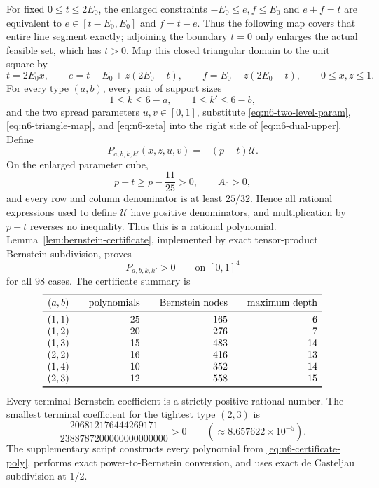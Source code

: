 \documentclass[11pt,a4paper]{article}
\numberwithin{equation}{section}
\theoremstyle{definition}
\newcommand{\1}{\mathbf{1}}
\begin{document}
For fixed $0\le t\le2E_0$, the enlarged constraints
$-E_0\le e,f\le E_0$ and $e+f=t$ are equivalent to
$e\in[t-E_0,E_0]$ and $f=t-e$.  Thus the following map covers that entire
line segment exactly; adjoining the boundary $t=0$ only enlarges the actual
feasible set, which has $t>0$.  Map this closed triangular domain to the
unit square by
\begin{equation}\label{eq:n6-triangle-map}
 t=2E_0x,
 \qquad
 e=t-E_0+z(2E_0-t),
 \qquad
 f=E_0-z(2E_0-t),
 \qquad 0\le x,z\le1.
\end{equation}
For every type $(a,b)$, every pair of support sizes
\[
 1\le k\le6-a,
 \qquad
 1\le k'\le6-b,
\]
and the two spread parameters $u,v\in[0,1]$, substitute
\eqref{eq:n6-two-level-param}, \eqref{eq:n6-triangle-map}, and
\eqref{eq:n6-zeta} into the right side of
\eqref{eq:n6-dual-upper}.  Define
\begin{equation}\label{eq:n6-certificate-poly}
 P_{a,b,k,k'}(x,z,u,v)=-(p-t)\mathcal U.
\end{equation}
On the enlarged parameter cube,
\[
 p-t\ge p-\frac{11}{25}>0,
 \qquad A_0>0,
\]
and every row and column denominator is at least $25/32$.  Hence all
rational expressions used to define $\mathcal U$ have positive denominators,
and multiplication by $p-t$ reverses no inequality.  Thus this is a
rational polynomial.  Lemma~\ref{lem:bernstein-certificate}, implemented by
exact tensor-product Bernstein subdivision, proves
\begin{equation}\label{eq:n6-certificate-positive}
 P_{a,b,k,k'}>0\qquad\text{on }[0,1]^4
\end{equation}
for all $98$ cases.  The certificate summary is
\begin{equation}\label{eq:n6-two-sided-table}
\begin{array}{c@{\qquad}r@{\qquad}r@{\qquad}r}
\toprule
(a,b)&\text{polynomials}&\text{Bernstein nodes}&\text{maximum depth}\\
\midrule
(1,1)&25&165&6\\
(1,2)&20&276&7\\
(1,3)&15&483&14\\
(2,2)&16&416&13\\
(1,4)&10&352&14\\
(2,3)&12&558&15\\
\bottomrule
\end{array}
\end{equation}
Every terminal Bernstein coefficient is a strictly positive rational
number.  The smallest terminal coefficient for the tightest type $(2,3)$ is
\begin{equation}\label{eq:n6-smallest-fourvar}
 \frac{206812176444269171}
 {2388787200000000000000}>0
 \qquad(\approx8.657622\times10^{-5}).
\end{equation}
The supplementary script constructs every polynomial from
\eqref{eq:n6-certificate-poly}, performs exact power-to-Bernstein conversion,
and uses exact de Casteljau subdivision at $1/2$.
\end{document}

